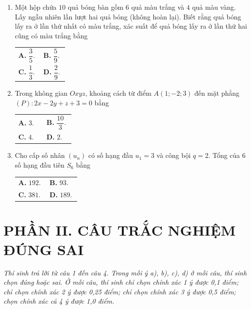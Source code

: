 \documentclass[12pt,a4paper]{article}
\makeatletter
\newcommand{\bonpa}[4]{\par\nobreak\smallskip\nobreak\noindent
\begin{tabular}{@{}p{0.47\linewidth}p{0.47\linewidth}@{}}
\textbf{A.} #1 & \textbf{B.} #2\\[8pt]
\textbf{C.} #3 & \textbf{D.} #4\end{tabular}}
\makeatother
\begin{document}
\begin{enumerate}
\item Một hộp chứa $10$ quả bóng bàn gồm $6$ quả màu trắng và $4$ quả màu vàng. Lấy ngẫu nhiên lần lượt hai quả bóng (không hoàn lại). Biết rằng quả bóng lấy ra ở lần thứ nhất có màu trắng, xác suất để quả bóng lấy ra ở lần thứ hai cũng có màu trắng bằng
\bonpa{$\dfrac{3}{5}$.}{$\dfrac{5}{9}$.}{$\dfrac{1}{3}$.}{$\dfrac{2}{9}$.}

\item Trong không gian $Oxyz$, khoảng cách từ điểm $A(1; -2; 3)$ đến mặt phẳng $(P): 2x - 2y + z + 3 = 0$ bằng
\bonpa{$3$.}{$\dfrac{10}{3}$.}{$4$.}{$2$.}

\item Cho cấp số nhân $(u_n)$ có số hạng đầu $u_1 = 3$ và công bội $q = 2$. Tổng của $6$ số hạng đầu tiên $S_6$ bằng
\bonpa{$192$.}{$93$.}{$381$.}{$189$.}
\end{enumerate}

\newpage
\section*{\large PHẦN II. CÂU TRẮC NGHIỆM ĐÚNG SAI}
\textit{Thí sinh trả lời từ câu 1 đến câu 4. Trong mỗi ý a), b), c), d) ở mỗi câu, thí sinh chọn đúng hoặc sai. Ở mỗi câu, thí sinh chỉ chọn chính xác 1 ý được 0,1 điểm; chỉ chọn chính xác 2 ý được 0,25 điểm; chỉ chọn chính xác 3 ý được 0,5 điểm; chọn chính xác cả 4 ý được 1,0 điểm.}
\end{document}
